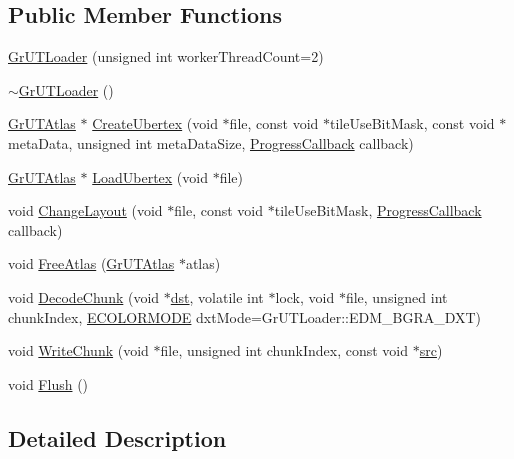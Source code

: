 \begin{CompactItemize}
\subsection*{Public Member Functions}
\begin{CompactItemize}
\item 
\hyperlink{class_gr_u_t_loader_d422dad3e01b8a264d6b4e3976736e81}{GrUTLoader} (unsigned int workerThreadCount=2)
\item 
\hyperlink{class_gr_u_t_loader_470a07f30f44b351519508c66b11ef22}{$\sim$GrUTLoader} ()
\item 
\hyperlink{class_gr_u_t_atlas}{GrUTAtlas} $\ast$ \hyperlink{class_gr_u_t_loader_9a52f424b6e3bb62afbfbd05e13d048a}{CreateUbertex} (void $\ast$file, const void $\ast$tileUseBitMask, const void $\ast$metaData, unsigned int metaDataSize, \hyperlink{class_gr_u_t_loader_b2a7be2e554d43ef1a6b4851ef4e0f39}{ProgressCallback} callback)
\item 
\hyperlink{class_gr_u_t_atlas}{GrUTAtlas} $\ast$ \hyperlink{class_gr_u_t_loader_8e7dbf8a92517c281d2b0587a4bcdf55}{LoadUbertex} (void $\ast$file)
\item 
void \hyperlink{class_gr_u_t_loader_291cd71cede4de0eafd22aad048f50e6}{ChangeLayout} (void $\ast$file, const void $\ast$tileUseBitMask, \hyperlink{class_gr_u_t_loader_b2a7be2e554d43ef1a6b4851ef4e0f39}{ProgressCallback} callback)
\item 
void \hyperlink{class_gr_u_t_loader_c61068d4af869e277fa8303dd2fc6689}{FreeAtlas} (\hyperlink{class_gr_u_t_atlas}{GrUTAtlas} $\ast$atlas)
\item 
void \hyperlink{class_gr_u_t_loader_021fb0768072b4306207993a4e8e5415}{DecodeChunk} (void $\ast$\hyperlink{glext__bak_8h_92034251bfd455d524a9b5610cddba00}{dst}, volatile int $\ast$lock, void $\ast$file, unsigned int chunkIndex, \hyperlink{class_gr_u_t_loader_328b8875d7cc411c1ad47f0d9279d8f2}{ECOLORMODE} dxtMode=GrUTLoader::EDM\_\-BGRA\_\-DXT)
\item 
void \hyperlink{class_gr_u_t_loader_9eca6963597c1c7e5c1f378774606f2f}{WriteChunk} (void $\ast$file, unsigned int chunkIndex, const void $\ast$\hyperlink{glext__bak_8h_72e0fdf0f845ded60b1fada9e9195cd7}{src})
\item 
void \hyperlink{class_gr_u_t_loader_a2715cc250d1bdbb321200ef630756cb}{Flush} ()
\end{CompactItemize}


\subsection{Detailed Description}



\end{CompactItemize}
